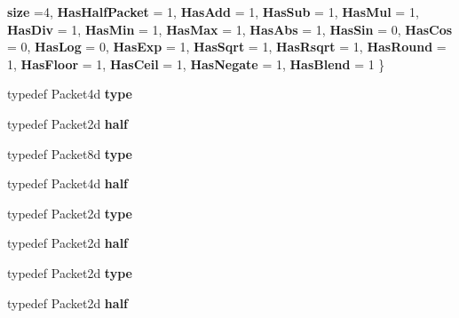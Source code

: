\begin{DoxyCompactItemize}
{\bfseries size} =4, 
{\bfseries Has\+Half\+Packet} = 1, 
\newline
{\bfseries Has\+Add} = 1, 
{\bfseries Has\+Sub} = 1, 
{\bfseries Has\+Mul} = 1, 
{\bfseries Has\+Div} = 1, 
\newline
{\bfseries Has\+Min} = 1, 
{\bfseries Has\+Max} = 1, 
{\bfseries Has\+Abs} = 1, 
{\bfseries Has\+Sin} = 0, 
\newline
{\bfseries Has\+Cos} = 0, 
{\bfseries Has\+Log} = 0, 
{\bfseries Has\+Exp} = 1, 
{\bfseries Has\+Sqrt} = 1, 
\newline
{\bfseries Has\+Rsqrt} = 1, 
{\bfseries Has\+Round} = 1, 
{\bfseries Has\+Floor} = 1, 
{\bfseries Has\+Ceil} = 1, 
\newline
{\bfseries Has\+Negate} = 1, 
{\bfseries Has\+Blend} = 1
 \}
\item 
\mbox{\label{struct_eigen_1_1internal_1_1packet__traits_3_01double_01_4_abfd8cf2aafb10174547c6590f5d34e43}} 
typedef Packet4d {\bfseries type}
\item 
\mbox{\label{struct_eigen_1_1internal_1_1packet__traits_3_01double_01_4_a703f4ec61806f74b62a675bd29cb9349}} 
typedef Packet2d {\bfseries half}
\item 
\mbox{\label{struct_eigen_1_1internal_1_1packet__traits_3_01double_01_4_adf86f5f3309a80b584d0cadcc610ae52}} 
typedef Packet8d {\bfseries type}
\item 
\mbox{\label{struct_eigen_1_1internal_1_1packet__traits_3_01double_01_4_a09ad1352c194ecdf15a0c9f55ea31115}} 
typedef Packet4d {\bfseries half}
\item 
\mbox{\label{struct_eigen_1_1internal_1_1packet__traits_3_01double_01_4_af113faa9c4cc1492c8d7b70329940f64}} 
typedef Packet2d {\bfseries type}
\item 
\mbox{\label{struct_eigen_1_1internal_1_1packet__traits_3_01double_01_4_a703f4ec61806f74b62a675bd29cb9349}} 
typedef Packet2d {\bfseries half}
\item 
\mbox{\label{struct_eigen_1_1internal_1_1packet__traits_3_01double_01_4_af113faa9c4cc1492c8d7b70329940f64}} 
typedef Packet2d {\bfseries type}
\item 
\mbox{\label{struct_eigen_1_1internal_1_1packet__traits_3_01double_01_4_a703f4ec61806f74b62a675bd29cb9349}} 
typedef Packet2d {\bfseries half}
\end{DoxyCompactItemize}



